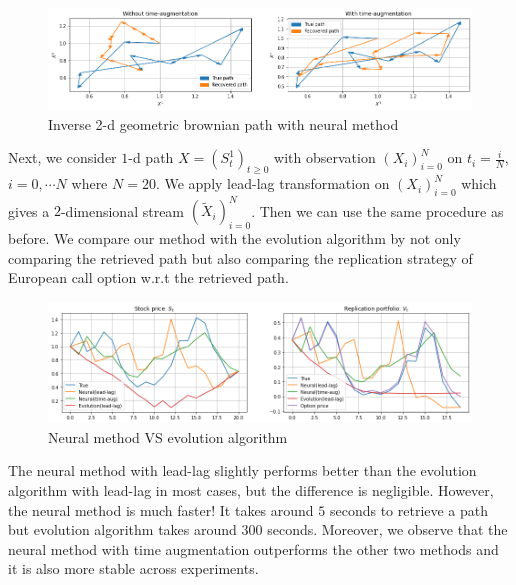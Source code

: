 \documentclass[12pt]{report}
\theoremstyle{definition}
\theoremstyle{remark}
\begin{document}
\begin{figure}[H]
  \centering
  \includegraphics[width=\textwidth]{figs/inverse7.png}
  \caption{Inverse 2-d geometric brownian path with neural method}
\end{figure}
Next, we consider $1$-d path $X = (S^{1}_{t})_{t\geq 0}$ with observation $(X_{i})_{i=0}^{N}$ on $t_{i} = \frac{i}{N}$, $i = 0,\cdots N$ where $N = 20$. We apply lead-lag transformation on $(X_{i})_{i=0}^{N}$ which gives a $2$-dimensional stream $(\tilde{X}_{i})_{i=0}^{N}$. Then we can use the same procedure as before. We compare our method with the evolution algorithm by not only comparing the retrieved path but also comparing the replication strategy of European call option w.r.t the retrieved path. 
\begin{figure}[H]
  \centering
  \includegraphics[width=\textwidth]{figs/inverse9.png}
  \caption{Neural method VS evolution algorithm}
\end{figure}
The neural method with lead-lag slightly performs better than the evolution algorithm with lead-lag in most cases, but the difference is negligible. However, the neural method is much faster! It takes around $5$ seconds to retrieve a path but evolution algorithm takes around $300$ seconds. Moreover, we observe that the neural method with time augmentation outperforms the other two methods and it is also more stable across experiments.   
\end{document}

